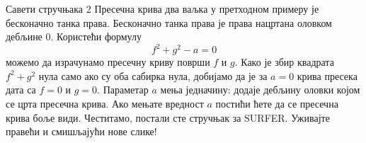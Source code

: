 \begin{surferPage}{Савети стручњака 2}
Пресечна крива два ваљка у претходном примеру је бесконачно танка права. Бесконачно танка права је права нацртана оловком дебљине 0. Користећи формулу
\[ f^2+g^2-a=0\]
можемо да израчунамо пресечну криву површи $f$ и $g$. Како је збир квадрата $f^2+g^2$ нула само ако су оба сабирка нула, добијамо да је за $a=0$ крива пресека дата са $f=0$ и $g=0$.
Параметар $a$ мења једначину: додаје дебљину оловки којом се црта пресечна крива. Ако мењате вредност $a$ постићи ћете да се пресечна крива боље види.
\newline \newline
Честитамо, постали сте стручњак за SURFER. Уживајте правећи и смишљајући нове слике!
\end{surferPage}
